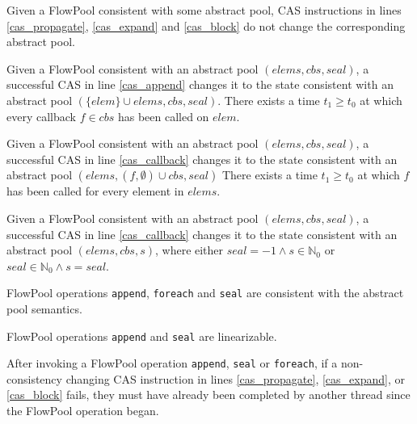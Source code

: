 \documentclass[runningheads,a4paper]{llncs}
\begin{document}
\begin{lemma}
Given a FlowPool consistent with some abstract
pool, CAS instructions in lines \ref{cas_propagate}, \ref{cas_expand} and
\ref{cas_block} do not change the corresponding abstract pool.
\end{lemma}

\begin{lemma}
Given a FlowPool consistent with an abstract pool $(elems, cbs,
seal)$, a successful CAS in line \ref{cas_append}
changes it to the state consistent with an abstract pool
$(\{elem\} \cup elems, cbs, seal)$.
There exists a time $t_1 \geq t_0$ at which every callback $f \in
cbs$ has been called on $elem$.
\end{lemma}

\begin{lemma}
Given a FlowPool consistent with an abstract pool $(elems, cbs, seal)$, 
a successful CAS in line \ref{cas_callback} changes it 
to the state consistent with an abstract pool $(elems, (f, \emptyset)
\cup cbs, seal)$
There exists a time $t_1 \geq t_0$ at which $f$ has been called for
every element in $elems$.
\end{lemma}

\begin{lemma}
Given a FlowPool consistent with an abstract pool $(elems, cbs, seal)$, 
a successful CAS in line \ref{cas_callback} changes it to the state 
consistent with an abstract pool $(elems, cbs, s)$, where either $seal
= -1 \wedge s \in \mathbb{N}_0$ or $seal \in \mathbb{N}_0 \wedge s = seal$.
\end{lemma}

\begin{theorem}[Safety]
FlowPool operations \verb=append=, \verb=foreach=
and \verb=seal= are consistent with the abstract pool semantics.
\end{theorem}

\begin{theorem}
FlowPool operations \verb=append= and \verb=seal= are linearizable.
\end{theorem}

\begin{lemma}
After invoking a FlowPool operation \verb=append=, \verb=seal= or
\verb=foreach=, if a non-consistency changing CAS instruction in lines
\ref{cas_propagate}, \ref{cas_expand}, or \ref{cas_block} fails, they must have
already been completed by another thread since the FlowPool operation began.
\end{lemma}
\end{document}
